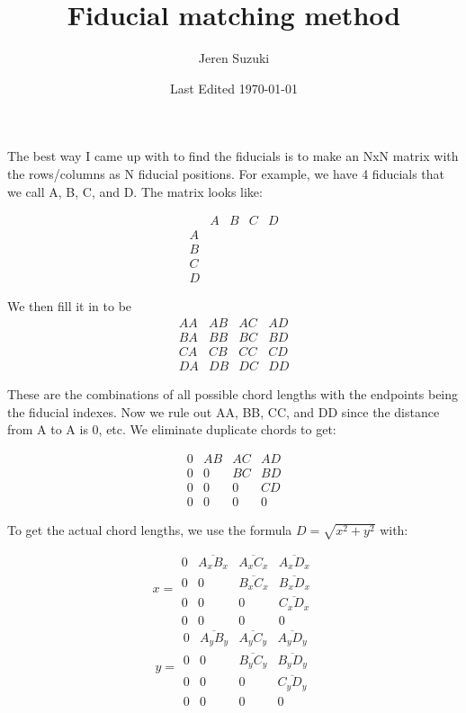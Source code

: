 \documentclass[10pt]{scrartcl}
\title{Fiducial matching method}
\author{Jeren Suzuki}
\date{Last Edited \today}
\begin{document}
\maketitle
{}
\clearpage
{}

The best way I came up with to find the fiducials is to make an NxN matrix with the rows/columns as N fiducial positions. For example, we have 4 fiducials that we call A, B, C, and D. The matrix looks like:

\[ \begin{array}{ccccc}
 & A & B & C & D \\
A & & & &  \\
B & & & &  \\
C & & & &  \\
D & & & &  \end{array} \] 

We then fill it in to be
\[ \begin{array}{cccc}
AA & AB & AC & AD \\
BA & BB & BC & BD \\
CA & CB & CC & CD \\
DA & DB & DC & DD \end{array}\]

These are the combinations of all possible chord lengths with the endpoints being the fiducial indexes. Now we rule out AA, BB, CC, and DD since the distance from A to A is 0, etc. We eliminate duplicate chords to get:

\[ \begin{array}{cccc}
0 & AB & AC & AD \\
0 & 0 & BC & BD \\
0 & 0 & 0 & CD \\
0 & 0 & 0 & 0 \end{array}\]

To get the actual chord lengths, we use the formula $D = \sqrt{x^2 + y^2}$ with:

\[ x = \begin{array}{cccc}
0 & \overline{A_xB_x} & \overline{A_xC_x} & \overline{A_xD_x} \\
0 & 0 & \overline{B_xC_x} & \overline{B_xD_x} \\
0 & 0 & 0 & \overline{C_xD_x} \\
0 & 0 & 0 & 0 \end{array}\]
\[ y = \begin{array}{cccc}
0 & \overline{A_yB_y} & \overline{A_yC_y} & \overline{A_yD_y} \\
0 & 0 & \overline{B_yC_y} & \overline{B_yD_y} \\
0 & 0 & 0 & \overline{C_yD_y} \\
0 & 0 & 0 & 0 \end{array}\]
\end{document}
